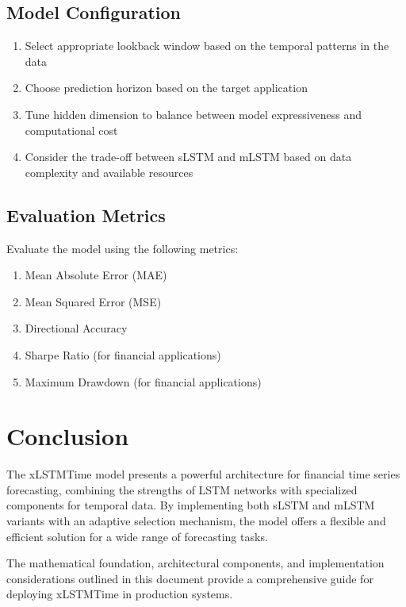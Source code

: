 \documentclass[11pt,a4paper]{article}
\begin{document}
\subsection{Model Configuration}

\begin{enumerate}
    \item Select appropriate lookback window based on the temporal patterns in the data
    \item Choose prediction horizon based on the target application
    \item Tune hidden dimension to balance between model expressiveness and computational cost
    \item Consider the trade-off between sLSTM and mLSTM based on data complexity and available resources
\end{enumerate}

\subsection{Evaluation Metrics}

Evaluate the model using the following metrics:
\begin{enumerate}
    \item Mean Absolute Error (MAE)
    \item Mean Squared Error (MSE)
    \item Directional Accuracy
    \item Sharpe Ratio (for financial applications)
    \item Maximum Drawdown (for financial applications)
\end{enumerate}

\section{Conclusion}

The xLSTMTime model presents a powerful architecture for financial time series forecasting, combining the strengths of LSTM networks with specialized components for temporal data. By implementing both sLSTM and mLSTM variants with an adaptive selection mechanism, the model offers a flexible and efficient solution for a wide range of forecasting tasks.

The mathematical foundation, architectural components, and implementation considerations outlined in this document provide a comprehensive guide for deploying xLSTMTime in production systems.
\end{document}
